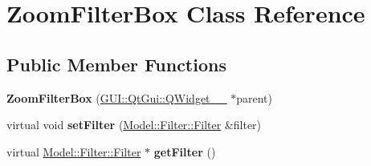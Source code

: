 \hypertarget{classGUI_1_1ZoomFilterBox}{}\section{Zoom\+Filter\+Box Class Reference}
\label{classGUI_1_1ZoomFilterBox}
\subsection*{Public Member Functions}
\begin{DoxyCompactItemize}
\item 
\hypertarget{classGUI_1_1ZoomFilterBox_a350574c3789575d523cfaa6e974ed7cb}{}{\bfseries Zoom\+Filter\+Box} (\hyperlink{classGUI_1_1QtGui_1_1QWidget____10}{G\+U\+I\+::\+Qt\+Gui\+::\+Q\+Widget\+\_\+\+\_} $\ast$parent)\label{classGUI_1_1ZoomFilterBox_a350574c3789575d523cfaa6e974ed7cb}

\item 
\hypertarget{classGUI_1_1ZoomFilterBox_ad7c0ee00fe3faac7942d75eec2a5342b}{}virtual void {\bfseries set\+Filter} (\hyperlink{classModel_1_1Filter_1_1Filter}{Model\+::\+Filter\+::\+Filter} \&filter)\label{classGUI_1_1ZoomFilterBox_ad7c0ee00fe3faac7942d75eec2a5342b}

\item 
\hypertarget{classGUI_1_1ZoomFilterBox_acef2029a93f4ab3a538cdb643b9c2613}{}virtual \hyperlink{classModel_1_1Filter_1_1Filter}{Model\+::\+Filter\+::\+Filter} $\ast$ {\bfseries get\+Filter} ()\label{classGUI_1_1ZoomFilterBox_acef2029a93f4ab3a538cdb643b9c2613}

\end{DoxyCompactItemize}
